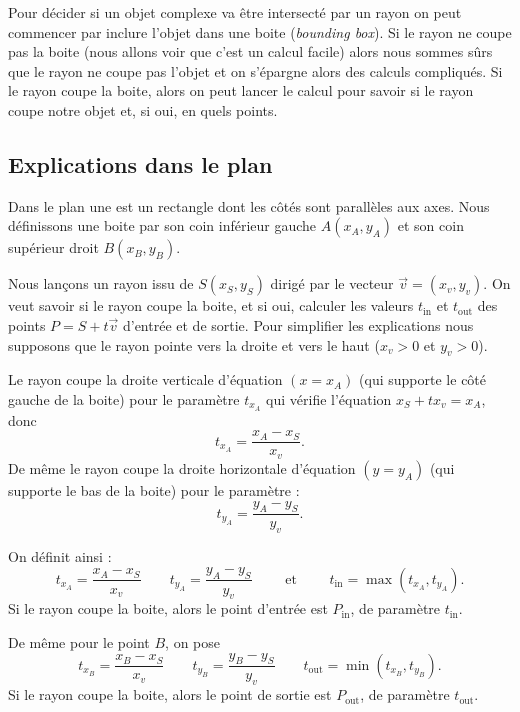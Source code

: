 \documentclass[11pt,class=report,crop=false]{standalone}
\begin{document}
Pour décider si un objet complexe va être intersecté par un rayon on peut commencer par inclure l'objet dans une boite (\emph{bounding box}). Si le rayon ne coupe pas la boite (nous allons voir que c'est un calcul facile) alors nous sommes sûrs que le rayon ne coupe pas l'objet et on s'épargne alors des calculs compliqués. Si le rayon coupe la boite, alors on peut lancer le calcul pour savoir si le rayon coupe notre objet et, si oui, en quels points.

\subsection{Explications dans le plan}


Dans le plan une  est un rectangle dont les côtés sont parallèles aux axes.
Nous définissons une boite par son coin inférieur gauche $A(x_A,y_A)$ et son coin supérieur droit $B(x_B,y_B)$.


Nous lançons un rayon issu de $S(x_S,y_S)$ dirigé par le vecteur $\vec v = (x_v,y_v)$.
On veut savoir si le rayon coupe la boite, et si oui, calculer les valeurs $t_{\text{in}}$ et $t_{\text{out}}$ des points $P = S + t \vec v$ d'entrée et de sortie.
Pour simplifier les explications nous supposons que le rayon pointe vers la droite et vers le haut ($x_v>0$ et $y_v>0$).



Le rayon coupe la droite verticale d'équation $(x=x_A)$ (qui supporte le côté gauche de la boite) pour le paramètre $t_{x_A}$ qui vérifie l'équation $x_S + t x_v = x_A$, donc 
$$t_{x_A} = \frac{x_A-x_S}{x_v}.$$
De même le rayon coupe la droite horizontale d'équation $(y=y_A)$ (qui supporte le bas de la boite) pour le paramètre :
$$t_{y_A} = \frac{y_A-y_S}{y_v}.$$


On définit ainsi :
$$
t_{x_A} = \frac{x_A-x_S}{x_v}\qquad
t_{y_A} = \frac{y_A-y_S}{y_v}\qquad \text{ et } \qquad
t_{\text{in}} = \max(t_{x_A},t_{y_A}).$$
Si le rayon coupe la boite, alors le point d'entrée est $P_{\text{in}}$, de paramètre 
$t_{\text{in}}$.

De même pour le point $B$, on pose 
$$
t_{x_B} = \frac{x_B-x_S}{x_v} \qquad
t_{y_B} = \frac{y_B-y_S}{y_v} \qquad
t_{\text{out}} = \min(t_{x_B},t_{y_B}).$$
Si le rayon coupe la boite, alors le point de sortie est $P_{\text{out}}$, de paramètre 
$t_{\text{out}}$.
\end{document}
